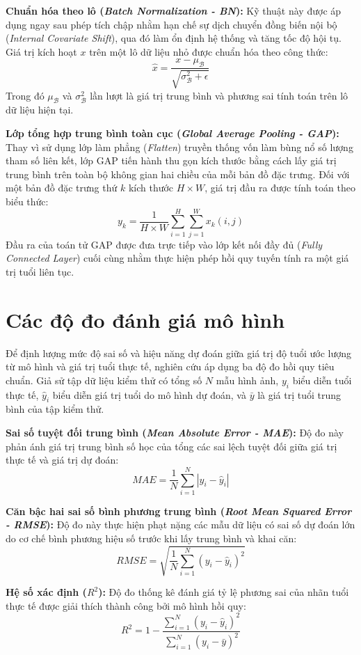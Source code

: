\textbf{Chuẩn hóa theo lô (\textit{Batch Normalization - BN}):} Kỹ thuật này được áp dụng ngay sau phép tích chập nhằm hạn chế sự dịch chuyển đồng biến nội bộ (\textit{Internal Covariate Shift}), qua đó làm ổn định hệ thống và tăng tốc độ hội tụ. Giá trị kích hoạt $x$ trên một lô dữ liệu nhỏ được chuẩn hóa theo công thức:
$$
\hat{x} = \frac{x - \mu_{\mathcal{B}}}{\sqrt{\sigma_{\mathcal{B}}^2 + \epsilon}}
$$
Trong đó $\mu_{\mathcal{B}}$ và $\sigma_{\mathcal{B}}^2$ lần lượt là giá trị trung bình và phương sai tính toán trên lô dữ liệu hiện tại.

\textbf{Lớp tổng hợp trung bình toàn cục (\textit{Global Average Pooling - GAP}):} Thay vì sử dụng lớp làm phẳng (\textit{Flatten}) truyền thống vốn làm bùng nổ số lượng tham số liên kết, lớp GAP tiến hành thu gọn kích thước bằng cách lấy giá trị trung bình trên toàn bộ không gian hai chiều của mỗi bản đồ đặc trưng. Đối với một bản đồ đặc trưng thứ $k$ kích thước $H \times W$, giá trị đầu ra được tính toán theo biểu thức:
$$
y_k = \frac{1}{H \times W} \sum_{i=1}^H \sum_{j=1}^W x_k(i,j)
$$
Đầu ra của toán tử GAP được đưa trực tiếp vào lớp kết nối đầy đủ (\textit{Fully Connected Layer}) cuối cùng nhằm thực hiện phép hồi quy tuyến tính ra một giá trị tuổi liên tục.

\section{Các độ đo đánh giá mô hình}
Để định lượng mức độ sai số và hiệu năng dự đoán giữa giá trị độ tuổi ước lượng từ mô hình và giá trị tuổi thực tế, nghiên cứu áp dụng ba độ đo hồi quy tiêu chuẩn. Giả sử tập dữ liệu kiểm thử có tổng số $N$ mẫu hình ảnh, $y_i$ biểu diễn tuổi thực tế, $\hat{y}_i$ biểu diễn giá trị tuổi do mô hình dự đoán, và $\bar{y}$ là giá trị tuổi trung bình của tập kiểm thử.

\textbf{Sai số tuyệt đối trung bình (\textit{Mean Absolute Error - MAE}):} Độ đo này phản ánh giá trị trung bình số học của tổng các sai lệch tuyệt đối giữa giá trị thực tế và giá trị dự đoán:
$$
MAE = \frac{1}{N} \sum_{i=1}^N |y_i - \hat{y}_i|
$$

\textbf{Căn bậc hai sai số bình phương trung bình (\textit{Root Mean Squared Error - RMSE}):} Độ đo này thực hiện phạt nặng các mẫu dữ liệu có sai số dự đoán lớn do cơ chế bình phương hiệu số trước khi lấy trung bình và khai căn:
$$
RMSE = \sqrt{\frac{1}{N} \sum_{i=1}^N (y_i - \hat{y}_i)^2}
$$

\textbf{Hệ số xác định ($R^2$):} Độ đo thống kê đánh giá tỷ lệ phương sai của nhãn tuổi thực tế được giải thích thành công bởi mô hình hồi quy:
$$
R^2 = 1 - \frac{\sum_{i=1}^N (y_i - \hat{y}_i)^2}{\sum_{i=1}^N (y_i - \bar{y})^2}
$$

